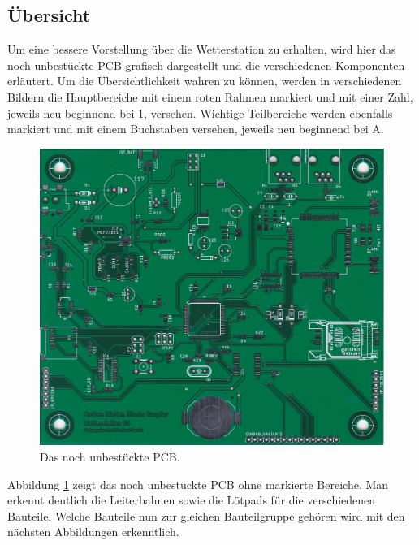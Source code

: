 \subsection{Übersicht}
\label{subsec:Uebersicht}
Um eine bessere Vorstellung über die Wetterstation zu erhalten, wird hier das noch unbestückte PCB grafisch dargestellt und die verschiedenen Komponenten erläutert. Um die Übersichtlichkeit wahren zu können, werden in verschiedenen Bildern die Hauptbereiche mit einem roten Rahmen markiert und mit einer Zahl, jeweils neu beginnend bei 1, versehen. Wichtige Teilbereiche werden ebenfalls markiert und mit einem Buchstaben versehen, jeweils neu beginnend bei A.

\begin{figure}[h]
\centering
\includegraphics[width=0.99\linewidth]{graphics/HW_Uebersicht/PCB_Unbestueckt.jpg}
\caption{Das noch unbestückte PCB.}
\label{fig:Uebersicht_PCB_blank}
\end{figure}
Abbildung \ref{fig:Uebersicht_PCB_blank} zeigt das noch unbestückte PCB ohne markierte Bereiche. Man erkennt deutlich die Leiterbahnen sowie die Lötpads für die verschiedenen Bauteile. Welche Bauteile nun zur gleichen Bauteilgruppe gehören wird mit den nächsten Abbildungen erkenntlich.

\newpage

